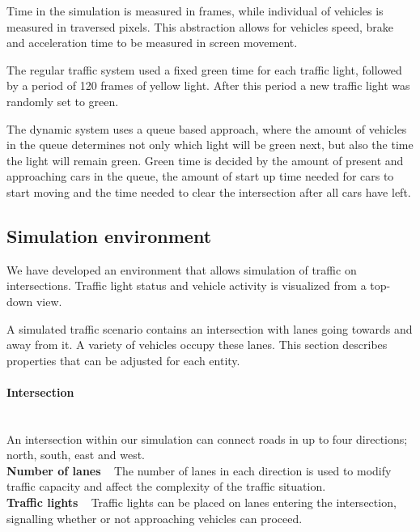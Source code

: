 \documentclass{article}
\begin{document}
Time in the simulation is measured in frames, while individual of vehicles is measured in traversed pixels. This abstraction allows for vehicles speed, brake and acceleration time to be measured in screen movement.

The regular traffic system used a fixed green time for each traffic light, followed by a period of 120 frames of yellow light. After this period a new traffic light was randomly set to green.

The dynamic system uses a queue based approach, where the amount of vehicles in the queue determines not only which light will be green next, but also the time the light will remain green. Green time is decided by the amount of present and approaching cars in the queue, the amount of start up time needed for cars to start moving and the time needed to clear the intersection after all cars have left. 



\subsection{Simulation environment}
We have developed an environment that allows simulation of traffic on intersections. Traffic light status and vehicle activity is visualized from a top-down view.

A simulated traffic scenario contains an intersection with lanes going towards and away from it. A variety of vehicles occupy these lanes. This section describes properties that can be adjusted for each entity.

\paragraph{Intersection} ~\\
An intersection within our simulation can connect roads in up to four directions; north, south, east and west. \\
\textbf{Number of lanes} ~ The number of lanes in each direction is used to modify traffic capacity and affect the complexity of the traffic situation.\\
\textbf{Traffic lights} ~ Traffic lights can be placed on lanes entering the intersection, signalling whether or not approaching vehicles can proceed.
\end{document}
